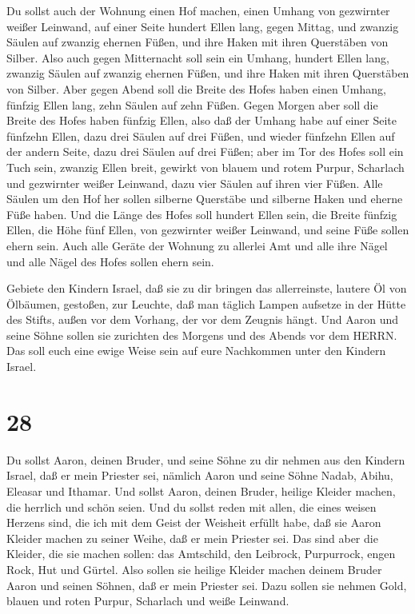  Du sollst auch der Wohnung einen Hof machen, einen Umhang
von gezwirnter weißer Leinwand, auf einer Seite hundert Ellen lang,
gegen Mittag,  und zwanzig Säulen auf zwanzig ehernen
Füßen, und ihre Haken mit ihren Querstäben von Silber. 
Also auch gegen Mitternacht soll sein ein Umhang, hundert Ellen lang,
zwanzig Säulen auf zwanzig ehernen Füßen, und ihre Haken mit ihren
Querstäben von Silber.  Aber gegen Abend soll die Breite
des Hofes haben einen Umhang, fünfzig Ellen lang, zehn Säulen auf zehn
Füßen.  Gegen Morgen aber soll die Breite des Hofes haben
fünfzig Ellen,  also daß der Umhang habe auf einer Seite
fünfzehn Ellen, dazu drei Säulen auf drei Füßen,  und
wieder fünfzehn Ellen auf der andern Seite, dazu drei Säulen auf drei
Füßen;  aber im Tor des Hofes soll ein Tuch sein, zwanzig
Ellen breit, gewirkt von blauem und rotem Purpur, Scharlach und
gezwirnter weißer Leinwand, dazu vier Säulen auf ihren vier Füßen.
 Alle Säulen um den Hof her sollen silberne Querstäbe und
silberne Haken und eherne Füße haben.  Und die Länge des
Hofes soll hundert Ellen sein, die Breite fünfzig Ellen, die Höhe fünf
Ellen, von gezwirnter weißer Leinwand, und seine Füße sollen ehern sein.
 Auch alle Geräte der Wohnung zu allerlei Amt und alle ihre
Nägel und alle Nägel des Hofes sollen ehern sein.

 Gebiete den Kindern Israel, daß sie zu dir bringen das
allerreinste, lautere Öl von Ölbäumen, gestoßen, zur Leuchte, daß man
täglich Lampen aufsetze  in der Hütte des Stifts, außen vor
dem Vorhang, der vor dem Zeugnis hängt. Und Aaron und seine Söhne sollen
sie zurichten des Morgens und des Abends vor dem HERRN. Das soll euch
eine ewige Weise sein auf eure Nachkommen unter den Kindern Israel.

\hypertarget{section-27}{%
\section{28}\label{section-27}}

 Du sollst Aaron, deinen Bruder, und seine Söhne zu dir
nehmen aus den Kindern Israel, daß er mein Priester sei, nämlich Aaron
und seine Söhne Nadab, Abihu, Eleasar und Ithamar.  Und
sollst Aaron, deinen Bruder, heilige Kleider machen, die herrlich und
schön seien.  Und du sollst reden mit allen, die eines
weisen Herzens sind, die ich mit dem Geist der Weisheit erfüllt habe,
daß sie Aaron Kleider machen zu seiner Weihe, daß er mein Priester sei.
 Das sind aber die Kleider, die sie machen sollen: das
Amtschild, den Leibrock, Purpurrock, engen Rock, Hut und Gürtel. Also
sollen sie heilige Kleider machen deinem Bruder Aaron und seinen Söhnen,
daß er mein Priester sei.  Dazu sollen sie nehmen Gold,
blauen und roten Purpur, Scharlach und weiße Leinwand.

